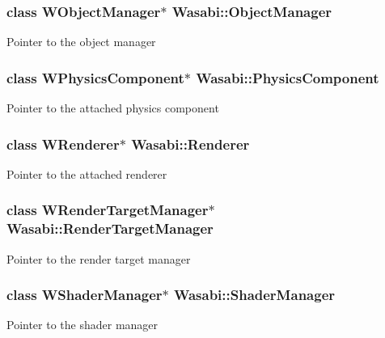 \subsubsection[{\texorpdfstring{Object\+Manager}{ObjectManager}}]{\setlength{\rightskip}{0pt plus 5cm}class {\bf W\+Object\+Manager}$\ast$ Wasabi\+::\+Object\+Manager}\hypertarget{class_wasabi_a9705f876ca565485338019f2d47b3ebf}{}\label{class_wasabi_a9705f876ca565485338019f2d47b3ebf}
Pointer to the object manager 
\subsubsection[{\texorpdfstring{Physics\+Component}{PhysicsComponent}}]{\setlength{\rightskip}{0pt plus 5cm}class {\bf W\+Physics\+Component}$\ast$ Wasabi\+::\+Physics\+Component}\hypertarget{class_wasabi_a9aa3491e5b662a435f4224f976c1132d}{}\label{class_wasabi_a9aa3491e5b662a435f4224f976c1132d}
Pointer to the attached physics component 
\subsubsection[{\texorpdfstring{Renderer}{Renderer}}]{\setlength{\rightskip}{0pt plus 5cm}class {\bf W\+Renderer}$\ast$ Wasabi\+::\+Renderer}\hypertarget{class_wasabi_aebe217f43a1a8525b41ebf0f1bd0454d}{}\label{class_wasabi_aebe217f43a1a8525b41ebf0f1bd0454d}
Pointer to the attached renderer 
\subsubsection[{\texorpdfstring{Render\+Target\+Manager}{RenderTargetManager}}]{\setlength{\rightskip}{0pt plus 5cm}class {\bf W\+Render\+Target\+Manager}$\ast$ Wasabi\+::\+Render\+Target\+Manager}\hypertarget{class_wasabi_aa2f6499ce71220726f09a0b8679c88c6}{}\label{class_wasabi_aa2f6499ce71220726f09a0b8679c88c6}
Pointer to the render target manager 
\subsubsection[{\texorpdfstring{Shader\+Manager}{ShaderManager}}]{\setlength{\rightskip}{0pt plus 5cm}class {\bf W\+Shader\+Manager}$\ast$ Wasabi\+::\+Shader\+Manager}\hypertarget{class_wasabi_a69ce6764f41fae49516fa1fbfe4376f5}{}\label{class_wasabi_a69ce6764f41fae49516fa1fbfe4376f5}
Pointer to the shader manager 
